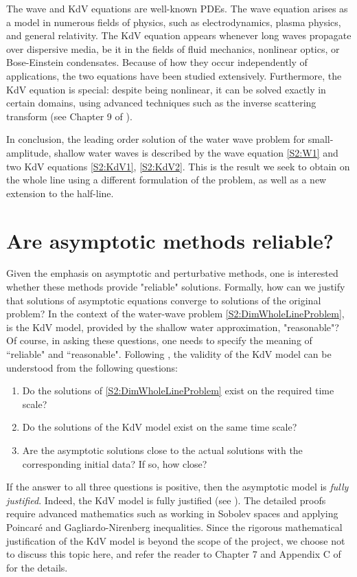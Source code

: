 The wave and KdV equations are well-known PDEs. The wave equation arises as a model in numerous fields of physics, such as electrodynamics, plasma physics, and general relativity. The KdV equation appears whenever long waves propagate over dispersive media, be it in the fields of fluid mechanics, nonlinear optics, or Bose-Einstein condensates. Because of how they occur independently of applications, the two equations have been studied extensively. Furthermore, the KdV equation is special: despite being nonlinear, it can be solved exactly in certain domains, using advanced techniques such as the inverse scattering transform (see Chapter 9 of \cite{Ablowitz}).

In conclusion, the leading order solution of the water wave problem for small-amplitude, shallow water waves is described by the wave equation \eqref{S2:W1} and two KdV equations \eqref{S2:KdV1}, \eqref{S2:KdV2}. This is the result we seek to obtain on the whole line using a different formulation of the problem, as well as a new extension to the half-line.

\section{Are asymptotic methods reliable?}
Given the emphasis on asymptotic and perturbative methods, one is interested whether these methods provide "reliable" solutions. Formally, how can we justify that solutions of asymptotic equations converge to solutions of the original problem? In the context of the water-wave problem \eqref{S2:DimWholeLineProblem}, is the KdV model, provided by the shallow water approximation, "reasonable"? Of course, in asking these questions, one needs to specify the meaning of ``reliable" and ``reasonable". Following \cite{Lannes}, the validity of the KdV model can be understood from the following questions:
\begin{enumerate}
\item Do the solutions of \eqref{S2:DimWholeLineProblem} exist on the required time scale?
\item Do the solutions of the KdV model exist on the same time scale?
\item Are the asymptotic solutions close to the actual solutions with the corresponding initial data? If so, how close?
\end{enumerate}
If the answer to all three questions is positive, then the asymptotic model is \textit{fully justified}. Indeed, the KdV model is fully justified (see \cite[p. 297-298]{Lannes}). The detailed proofs require advanced mathematics such as working in Sobolev spaces and applying Poincaré and Gagliardo-Nirenberg inequalities. Since the rigorous mathematical justification of the KdV model is beyond the scope of the project, we choose not to discuss this topic here, and refer the reader to Chapter 7 and Appendix C of \cite{Lannes} for the details.